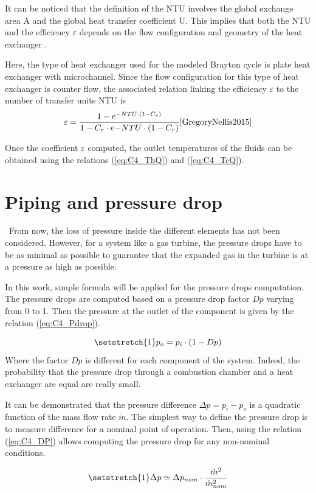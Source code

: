 It can be noticed that the definition of the NTU involves the global exchange area $\mathrm{A}$ and the global heat transfer coefficient $\mathrm{U}$. This implies that both the NTU and the efficiency $\varepsilon$ depends on the flow configuration and geometry of the heat exchanger .  

Here, the type of heat exchanger used for the modeled Brayton cycle is plate heat exchanger with microchannel. Since the flow configuration for this type of heat exchanger is counter flow, the associated relation linking the efficiency \(\varepsilon\) to the number of transfer units  NTU is
\begin{equation*}
    \varepsilon = \frac{1 - e^{-NTU\cdot \left(1 - C_r\right)}}{1 - C_r\cdot e{-NTU\cdot \left(1 - C_r\right)}}\cite{GregoryNellis2015}
\end{equation*}

Once the coefficient \(\varepsilon\) computed, the outlet temperatures of the fluids can be obtained using the relations (\ref{eq:C4_ThQ}) and (\ref{eq:C4_TcQ}).


\section{Piping and pressure drop}
\quad\ From now, the loss of pressure inside the different elements has not been considered. However, for a system like a gas turbine, the pressure drops have to be as minimal as possible to guarantee that the expanded gas in the turbine is at a pressure as high as possible.

In this work, simple formula will be applied for the pressure drops computation. The pressure drops are computed based on a pressure drop factor \(Dp\) varying from 0 to 1. Then the pressure at the outlet of the component is given by the relation (\ref{eq:C4_Pdrop}).

\begin{equation}
    \setstretch{1}
    p_{o} = p_{i}\cdot (1 - Dp)\label{eq:C4_Pdrop}
\end{equation}
Where the factor \(Dp\) is different for each component of the system. Indeed, the probability that the pressure drop through a combustion chamber and a heat exchanger are equal are really small.

It can be demonstrated that the pressure difference \(\Delta p = p_{i} - p_{o}\) is a quadratic function of the mass flow rate \(\dot{m}\). The simplest way to define the pressure drop is to measure difference for a nominal point of operation. Then, using the relation (\ref{eq:C4_DP}) allows computing the pressure drop for any non-nominal conditions.

\begin{equation}
    \setstretch{1}
    \Delta p \simeq \Delta p_{nom}\cdot \frac{\dot{m}^2}{\dot{m}^2_{nom}}\label{eq:C4_DP}
\end{equation}